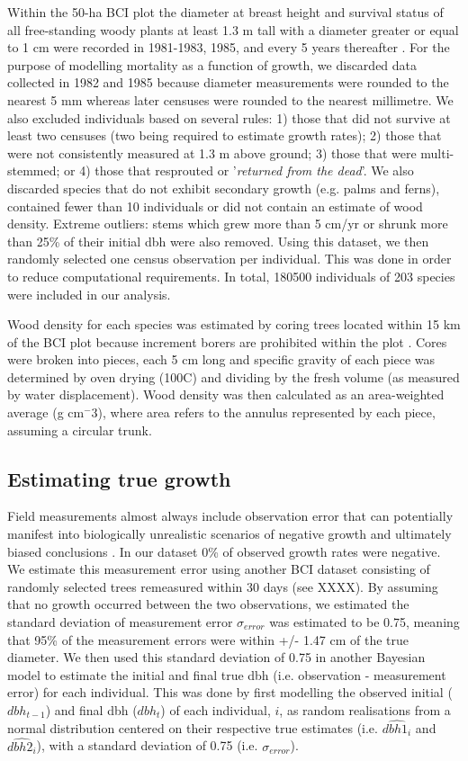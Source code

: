 \documentclass[a4paper,11pt]{article}\usepackage[]{graphicx}\usepackage[]{color}
\begin{document}
Within the 50-ha BCI plot the diameter at breast height and survival status of all free-standing woody plants at least 1.3 m tall with a diameter greater or equal to 1 cm were recorded in 1981-1983, 1985, and every 5 years thereafter \citep{Condit:2012nz}. For the purpose of modelling mortality as a function of growth, we discarded data collected in 1982 and 1985 because diameter measurements were rounded to the nearest 5 mm whereas later censuses were rounded to the nearest millimetre. We also excluded individuals based on several rules: 1) those that did not survive at least two censuses (two being required to estimate growth rates); 2) those that were not consistently measured at 1.3 m above ground; 3) those that were multi-stemmed; or 4) those that resprouted or '\textit{returned from the dead}'. We also discarded species that do not exhibit secondary growth (e.g. palms and ferns), contained fewer than 10 individuals or did not contain an estimate of wood density. Extreme outliers: stems which grew more than 5 cm/yr or shrunk more than 25\% of their initial dbh were also removed. Using this dataset, we then randomly selected one census observation per individual. This was done in order to reduce computational requirements. In total, 180500 individuals of 203 species were included in our analysis.

Wood density for each species was estimated by coring trees located within 15 km of the BCI plot because increment borers are prohibited within the plot \citep{Wright:2010fl}. Cores were broken into pieces, each 5 cm long and specific gravity of each piece was determined by oven drying (100\degree C) and dividing by the fresh volume (as measured by water displacement). Wood density was then calculated as an area-weighted average (g cm$^-3$), where area refers to the annulus represented by each piece, assuming a circular trunk.

\subsection{Estimating true growth}
Field measurements almost always include observation error that can potentially manifest into biologically unrealistic scenarios of negative growth and ultimately biased conclusions \citep{Kery:2010tp}. In our dataset 0\% of observed growth rates were negative. We estimate this measurement error using another BCI dataset consisting of  randomly selected trees remeasured within 30 days (see XXXX). By assuming that no growth occurred between the two observations, we estimated the standard deviation of measurement error 
$\sigma_{error}$ was estimated to be 0.75, meaning that 95\% of the measurement errors were within +/- 1.47 cm of the true diameter. We then used this standard deviation of 0.75 in another Bayesian model to estimate the initial and final true dbh (i.e. observation - measurement error) for each individual. This was done by first modelling the observed initial ($dbh_{t-1}$) and final dbh ($dbh_{t}$) of each individual, $i$, as random realisations from a normal distribution centered on their respective true estimates (i.e. $\widehat{dbh1_i}$ and $\widehat{dbh2_i}$), with a standard deviation of 0.75 (i.e. $\sigma_{error}$).


\end{document}

